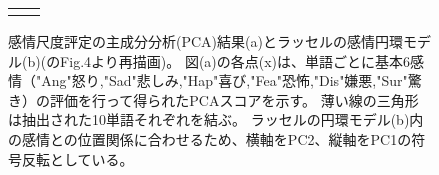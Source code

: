 
\begin{figure}[t]

  \begin{tabular}{cc}
  \begin{minipage} {0.47\hsize}
  \centering
  \includegraphics [ width = 1\columnwidth]{Figure/ExpAngHapSad/FigPCA_CumAll_scatter_SndTriangle_Eng.eps}
  \end{minipage} & 
  
  \begin{minipage} {0.47\hsize}
  \centering
  \includegraphics [ width = 1\columnwidth]{Figure/ExpAngHapSad/Fig_RusselCircle_b.eps }
  \end{minipage}
  
  \end{tabular}
  
  \caption{感情尺度評定の主成分分析(PCA)結果(a)とラッセルの感情円環モデル(b)(\cite{russell1980circumplex}のFig.4より再描画)。
            図(a)の各点(x)は、単語ごとに基本6感情（"Ang"怒り,"Sad"悲しみ,"Hap"喜び,"Fea"恐怖,"Dis"嫌悪,"Sur"驚き）の評価を行って得られたPCAスコアを示す。
            薄い線の三角形は抽出された10単語それぞれを結ぶ。
            ラッセルの円環モデル(b)内の感情との位置関係に合わせるため、横軸をPC2、縦軸をPC1の符号反転としている。
            }
  \label{fig:PCA-Russel_AngHapSad} 

\end{figure}

